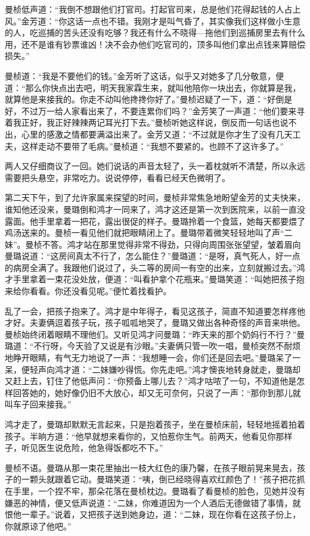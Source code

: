 \par 曼桢低声道：“我倒不想跟他们打官司。打起官司来，总是他们花得起钱的人占上风。”金芳道：“你这话一点也不错。我刚才是叫气昏了，其实像我们这样做小生意的人，吃巡捕的苦头还没有吃够？我还有什么不晓得—拖他们到巡捕房里去有什么用，还不是谁有钞票谁凶！决不会办他们吃官司的，顶多叫他们拿出点钱来算赔偿损失。”
\par 曼桢道：“我是不要他们的钱。”金芳听了这话，似乎又对她多了几分敬意，便道：“那么你快点出去吧，明天我家霖生来，就叫他陪你一块出去，你就算是我，就算他是来接我的。你走不动叫他搀搀你好了。”曼桢迟疑了一下，道：“好倒是好，不过万一给人家看出来了，不要连累你们吗？”金芳笑了一声道：“他们要来寻着我正好，我正好辣辣两记耳光打下去。”曼桢听她这样说，倒反而一句话也说不出，心里的感激之情都要满溢出来了。金芳又道：“不过就是你才生了没有几天工夫，这样走动不要带了毛病。”曼桢道：“我想不要紧的。也顾不了这许多了。”
\par 两人又仔细商议了一回。她们说话的声音太轻了，头一着枕就听不清楚，所以永远需要把头悬空，非常吃力。说说停停，看看已经天色微明了。
\par 第二天下午，到了允许家属来探望的时间，曼桢非常焦急地盼望金芳的丈夫快来，谁知他还没来，曼璐倒和鸿才一同来了，鸿才这还是第一次到医院来，以前一直没露面。他手里拿着一把花，露出很促的样子。曼璐拎着一个食篮，她每天都要煨了鸡汤送来的。曼桢一看见他们就把眼睛闭上了。曼璐带着微笑轻轻地叫了声“二妹”。曼桢不答。鸿才站在那里觉得非常不得劲，只得向周围张张望望，皱着眉向曼璐说道：“这房间真太不行了，怎么能住？”曼璐道：“是呀，真气死人，好一点的病房全满了。我跟他们说过了，头二等的房间一有空的出来，立刻就搬过去。”鸿才手里拿着一束花没处放，便道：“叫看护拿个花瓶来。”曼璐笑道：“叫她把孩子抱来给你看看。你还没看见呢。”便忙着找看护。
\par 乱了一会，把孩子抱来了。鸿才是中年得子，看见这孩子，简直不知道要怎样疼他才好。夫妻俩逗着孩子玩，孩子呱呱地哭了，曼璐又做出各种奇怪的声音来哄他。曼桢始终闭着眼睛不理他们。又听见鸿才问曼璐：“昨天来的那个奶妈行不行？”曼璐道：“不行呀，今天验了又说是有沙眼。”夫妻俩只管一吹一唱，曼桢突然不耐烦地睁开眼睛，有气无力地说了一声：“我想睡一会，你们还是回去吧。”曼璐呆了一呆，便轻声向鸿才道：“二妹嫌吵得慌。你先走吧。”鸿才懊丧地转身就走，曼璐却又赶上去，钉住了他低声问：“你预备上哪儿去？”鸿才咕哝了一句，不知道他是怎样回答她的，她好像仍旧不大放心，却又无可奈何，只说了一声：“那你到那儿就叫车子回来接我。”
\par 鸿才走了，曼璐却默默无言起来，只是抱着孩子，坐在曼桢床前，轻轻地摇着拍着孩子。半晌方道：“他早就想来看你的，又怕惹你生气。前两天，他看见你那样子，听见医生说危险，他急得饭都吃不下。”
\par 曼桢不语。曼璐从那一束花里抽出一枝大红色的康乃馨，在孩子眼前晃来晃去，孩子的一颗头就跟着它动。曼璐笑道：“咦，倒已经晓得喜欢红颜色了！”孩子把花抓在手里，一个捏不牢，那朵花落在曼桢枕边。曼璐看了看曼桢的脸色，见她并没有嫌恶的神情，便又低声说道：“二妹，你难道因为一个人酒后无德做错了事情，就恨他一辈子。”说着，又把孩子送到她身边，道：“二妹，现在你看在这孩子份上，你就原谅了他吧。”
